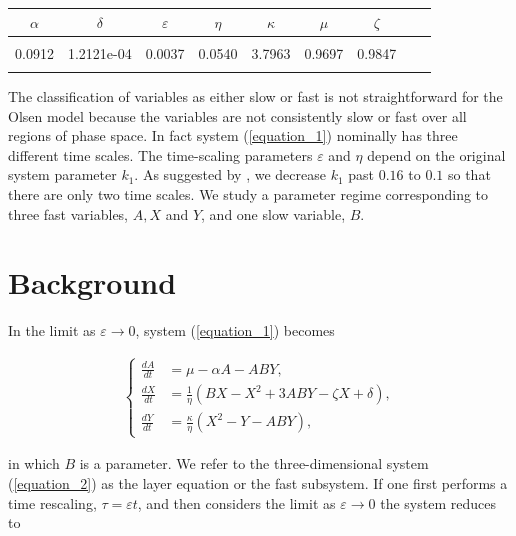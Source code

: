 \documentclass{ws-ijbc}
\begin{document}
\begin{table}[!t]
{\begin{tabular}{c  c  c  c  c  c  c  c  c} \\[-2pt]
\toprule
$\alpha$ & $\delta$ & $\varepsilon$ & $\eta$ & $\kappa$ & $\mu$ & $\zeta$ \\[6pt]
\hline\\[-2pt]
0.0912 & 1.2121e-04 & 0.0037 & 0.0540 & 3.7963 & 0.9697 & 0.9847\\[1pt]
\botrule
\end{tabular}}
\end{table}

The classification of variables as either slow or fast is not straightforward for the Olsen model because the variables are not consistently slow or fast over all regions of phase space.  In fact system (\ref{equation_1}) nominally has three different time scales.  The time-scaling parameters $\varepsilon$ and $\eta$ depend on the original system parameter $k_1$.  As suggested by \cite{Rescaling}, we decrease $k_{1}$ past $0.16$ to $0.1$ so that there are only two time scales.  We study a parameter regime corresponding to three fast variables, $A, X$ and $Y$, and one slow variable, $B$.

\section{Background}
    
In the limit as $\varepsilon \rightarrow 0$, system (\ref{equation_1}) becomes
    
\begin{equation}
\begin{aligned}
\begin{cases}
\frac{dA}{dt} &= \mu - \alpha A - ABY, \\
\frac{dX}{dt} &= \frac{1}{\eta}(BX - X^2 +3ABY - \zeta X + \delta), \\
\frac{dY}{dt} &= \frac{\kappa}{\eta}(X^2 - Y - ABY),
\end{cases}
\end{aligned}
\label{equation_2}
\end{equation}
    
\noindent
in which $B$ is a parameter.  We refer to the three-dimensional system (\ref{equation_2}) as the layer equation or the fast subsystem.  If one first performs a time rescaling, $\tau = \varepsilon t$, and then considers the limit as $\varepsilon \rightarrow 0$ the system reduces to
    
\end{document}
